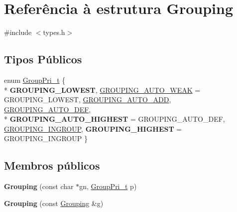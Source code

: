 \hypertarget{struct_grouping}{\section{Referência à estrutura Grouping}
\label{struct_grouping}
}


{\ttfamily \#include $<$types.\-h$>$}

\subsection*{Tipos Públicos}
\begin{DoxyCompactItemize}
\item 
enum \hyperlink{struct_grouping_ae0be00a2b5dfbbc6c4558e88dddc9d81}{Group\-Pri\-\_\-t} \{ \\*
{\bfseries G\-R\-O\-U\-P\-I\-N\-G\-\_\-\-L\-O\-W\-E\-S\-T}, 
\hyperlink{struct_grouping_ae0be00a2b5dfbbc6c4558e88dddc9d81a6053156b166a5a8f7d14fef970007496}{G\-R\-O\-U\-P\-I\-N\-G\-\_\-\-A\-U\-T\-O\-\_\-\-W\-E\-A\-K} = G\-R\-O\-U\-P\-I\-N\-G\-\_\-\-L\-O\-W\-E\-S\-T, 
\hyperlink{struct_grouping_ae0be00a2b5dfbbc6c4558e88dddc9d81a92c24d1f1d0dae3cfcab9b707997f2be}{G\-R\-O\-U\-P\-I\-N\-G\-\_\-\-A\-U\-T\-O\-\_\-\-A\-D\-D}, 
\hyperlink{struct_grouping_ae0be00a2b5dfbbc6c4558e88dddc9d81a66b2fede7b9cecce0573f55995f3c69d}{G\-R\-O\-U\-P\-I\-N\-G\-\_\-\-A\-U\-T\-O\-\_\-\-D\-E\-F}, 
\\*
{\bfseries G\-R\-O\-U\-P\-I\-N\-G\-\_\-\-A\-U\-T\-O\-\_\-\-H\-I\-G\-H\-E\-S\-T} = G\-R\-O\-U\-P\-I\-N\-G\-\_\-\-A\-U\-T\-O\-\_\-\-D\-E\-F, 
\hyperlink{struct_grouping_ae0be00a2b5dfbbc6c4558e88dddc9d81aea9fe59d5df9216d58ad5c17e1974778}{G\-R\-O\-U\-P\-I\-N\-G\-\_\-\-I\-N\-G\-R\-O\-U\-P}, 
{\bfseries G\-R\-O\-U\-P\-I\-N\-G\-\_\-\-H\-I\-G\-H\-E\-S\-T} = G\-R\-O\-U\-P\-I\-N\-G\-\_\-\-I\-N\-G\-R\-O\-U\-P
 \}
\end{DoxyCompactItemize}
\subsection*{Membros públicos}
\begin{DoxyCompactItemize}
\item 
\hypertarget{struct_grouping_a343ddc7c910745b191f9f87ef624a040}{{\bfseries Grouping} (const char $\ast$gn, \hyperlink{struct_grouping_ae0be00a2b5dfbbc6c4558e88dddc9d81}{Group\-Pri\-\_\-t} p)}\label{struct_grouping_a343ddc7c910745b191f9f87ef624a040}

\item 
\hypertarget{struct_grouping_a4827d9b9a46b77499df6bec3aa034d48}{{\bfseries Grouping} (const \hyperlink{struct_grouping}{Grouping} \&g)}\label{struct_grouping_a4827d9b9a46b77499df6bec3aa034d48}

\end{DoxyCompactItemize}
